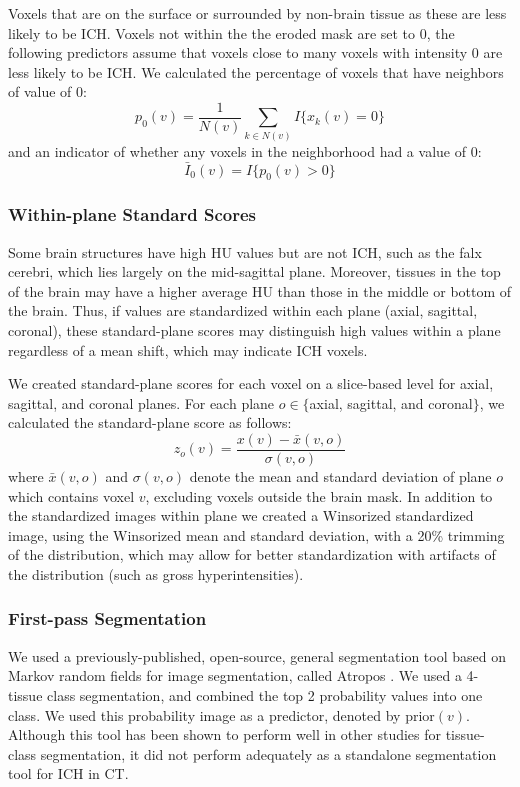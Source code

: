 \documentclass{elsarticle_nonatbib}\usepackage[]{graphicx}\usepackage[]{color}
\begin{document}
Voxels that are on the surface or surrounded by non-brain tissue as these are less likely to be ICH.  Voxels not within the the eroded mask are set to $0$, the following predictors assume that voxels close to many voxels with intensity $0$ are less likely to be ICH.    
We calculated the percentage of voxels that have neighbors of value of $0$:
\begin{equation}
p_{0}(v) = \frac{1}{N(v)} \sum_{k \in N(v)} I\{ x_k(v) = 0 \} \label{eq:pct0}
\end{equation}
and an indicator of whether any voxels in the neighborhood had a value of $0$:
\begin{equation}
\bar{I}_{0}(v) = I\{ p_{0}(v) > 0 \} \label{eq:I0}
\end{equation}
 
\subsubsection{Within-plane Standard Scores} Some brain structures have high HU values but are not ICH, such as the falx cerebri, which lies largely on the mid-sagittal plane.  Moreover, tissues in the top of the brain may have a higher average HU than those in the middle or bottom of the brain.  Thus, if values are standardized within each plane (axial, sagittal, coronal), these standard-plane scores may distinguish high values within a plane regardless of a mean shift, which may indicate ICH voxels.

We created standard-plane scores for each voxel on a slice-based level for axial, sagittal, and coronal planes. For each plane $o \in \{$axial, sagittal, and coronal$\}$, we calculated the standard-plane score as follows: 
\begin{equation}
z_{o}(v) = \frac{x(v) - \bar{x}(v, o)}{\sigma(v, o)} \label{eq:z}
\end{equation}
where $\bar{x}(v, o)$ and $\sigma(v, o)$ denote the mean and standard deviation of plane $o$ which contains voxel $v$, excluding voxels outside the brain mask.   In addition to the standardized images within plane we created a Winsorized standardized image, using the Winsorized mean and standard deviation, with a 20\% trimming of the distribution, which may allow for better standardization with artifacts of the distribution (such as gross hyperintensities). 

\subsubsection{First-pass Segmentation} We used a previously-published, open-source, general segmentation tool based on Markov random fields for image segmentation, called Atropos \citep{atropos}.  We used a 4-tissue class segmentation, and combined the top 2 probability values into one class.  We used this probability image as a predictor, denoted by $\text{prior}(v)$.  Although this tool has been shown to perform well in other studies for tissue-class segmentation, it did not perform adequately as a standalone segmentation tool for ICH in CT.  
\end{document}
